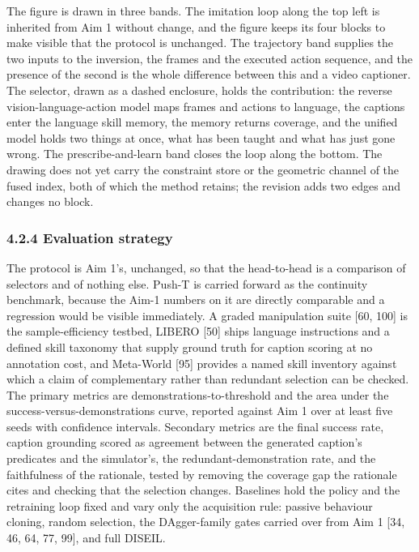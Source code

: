 \documentclass[
  11pt,
]{article}
\begin{document}
The figure is drawn in three bands. The imitation loop along the top
left is inherited from Aim 1 without change, and the figure keeps its
four blocks to make visible that the protocol is unchanged. The
trajectory band supplies the two inputs to the inversion, the frames and
the executed action sequence, and the presence of the second is the
whole difference between this and a video captioner. The selector, drawn
as a dashed enclosure, holds the contribution: the reverse
vision-language-action model maps frames and actions to language, the
captions enter the language skill memory, the memory returns coverage,
and the unified model holds two things at once, what has been taught and
what has just gone wrong. The prescribe-and-learn band closes the loop
along the bottom. The drawing does not yet carry the constraint store or
the geometric channel of the fused index, both of which the method
retains; the revision adds two edges and changes no block.

\hypertarget{evaluation-strategy}{%
\subsubsection{4.2.4 Evaluation strategy}\label{evaluation-strategy}}

The protocol is Aim 1's, unchanged, so that the head-to-head is a
comparison of selectors and of nothing else. Push-T is carried forward
as the continuity benchmark, because the Aim-1 numbers on it are
directly comparable and a regression would be visible immediately. A
graded manipulation suite {[}60, 100{]} is the sample-efficiency
testbed, LIBERO {[}50{]} ships language instructions and a defined skill
taxonomy that supply ground truth for caption scoring at no annotation
cost, and Meta-World {[}95{]} provides a named skill inventory against
which a claim of complementary rather than redundant selection can be
checked. The primary metrics are demonstrations-to-threshold and the
area under the success-versus-demonstrations curve, reported against Aim
1 over at least five seeds with confidence intervals. Secondary metrics
are the final success rate, caption grounding scored as agreement
between the generated caption's predicates and the simulator's, the
redundant-demonstration rate, and the faithfulness of the rationale,
tested by removing the coverage gap the rationale cites and checking
that the selection changes. Baselines hold the policy and the retraining
loop fixed and vary only the acquisition rule: passive behaviour
cloning, random selection, the DAgger-family gates carried over from Aim
1 {[}34, 46, 64, 77, 99{]}, and full DISEIL.
\end{document}
